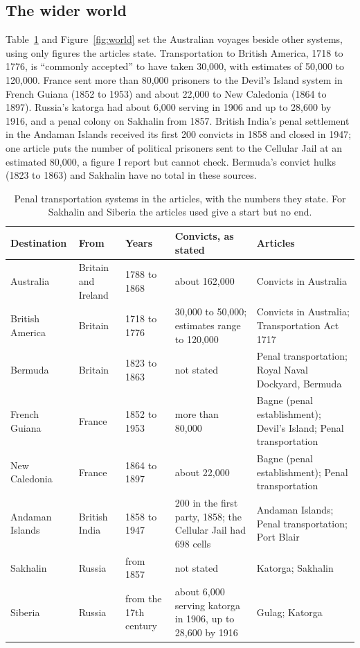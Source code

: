 \documentclass[11pt,a4paper]{article}
\begin{document}
\subsection{The wider world}
Table~\ref{tab:world} and Figure~\ref{fig:world} set the Australian voyages beside other systems, using only figures the articles state. Transportation to British America, 1718 to 1776, is ``commonly accepted'' to have taken 30,000, with estimates of 50,000 to 120,000. France sent more than 80,000 prisoners to the Devil's Island system in French Guiana (1852 to 1953) and about 22,000 to New Caledonia (1864 to 1897). Russia's katorga had about 6,000 serving in 1906 and up to 28,600 by 1916, and a penal colony on Sakhalin from 1857. British India's penal settlement in the Andaman Islands received its first 200 convicts in 1858 and closed in 1947; one article puts the number of political prisoners sent to the Cellular Jail at an estimated 80,000, a figure I report but cannot check. Bermuda's convict hulks (1823 to 1863) and Sakhalin have no total in these sources.

\begin{table}[tbp]\centering\footnotesize\setlength{\tabcolsep}{4pt}\caption{Penal transportation systems in the articles, with the numbers they state. For Sakhalin and Siberia the articles used give a start but no end.}\label{tab:world}\begin{tabular}{p{2.4cm}p{1.9cm}p{2.3cm}p{4.0cm}p{4.0cm}}\toprule Destination & From & Years & Convicts, as stated & Articles\\\midrule
Australia & Britain and Ireland & 1788 to 1868 & about 162,000 & Convicts in Australia\\
British America & Britain & 1718 to 1776 & 30,000 to 50,000; estimates range to 120,000 & Convicts in Australia; Transportation Act 1717\\
Bermuda & Britain & 1823 to 1863 & not stated & Penal transportation; Royal Naval Dockyard, Bermuda\\
French Guiana & France & 1852 to 1953 & more than 80,000 & Bagne (penal establishment); Devil's Island; Penal transportation\\
New Caledonia & France & 1864 to 1897 & about 22,000 & Bagne (penal establishment); Penal transportation\\
Andaman Islands & British India & 1858 to 1947 & 200 in the first party, 1858; the Cellular Jail had 698 cells & Andaman Islands; Penal transportation; Port Blair\\
Sakhalin & Russia & from 1857 & not stated & Katorga; Sakhalin\\
Siberia & Russia & from the 17th century & about 6,000 serving katorga in 1906, up to 28,600 by 1916 & Gulag; Katorga\\
\bottomrule\end{tabular}\end{table}
\end{document}
